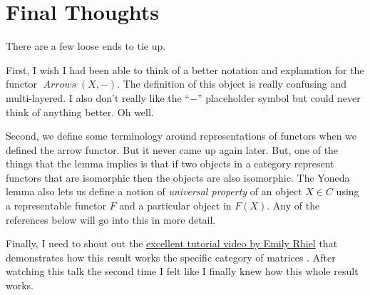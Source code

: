 \documentclass[12pt]{article}
\theoremstyle{definition}
\theoremstyle{definition}
\theoremstyle{definition}
\numberwithin{equation}{section}
\DeclareMathOperator{\Arrows}{\mathit{Arrows}}
\begin{document}
\section{Final Thoughts}

There are a few loose ends to tie up.

First, I wish I had been able to think of a better notation and explanation for the functor 
$\Arrows(X, -)$. The definition of this object is really confusing and multi-layered. 
I also don't really like the ``$-$'' placeholder symbol but could 
never think of anything better. Oh well.

Second, we define some terminology around representations of functors when we defined the arrow functor. But 
it never came up again later. But, one of the things that the lemma implies is that if two objects 
in a category represent functors that are isomorphic
then the objects are also isomorphic. The Yoneda lemma also lets us define a notion of {\it universal property} 
of an object $X \in C$ using a representable functor $F$ and a particular object in $F(X)$.
Any of the references below will go into this in more detail.

Finally, I need to shout out the 
\href{https://www.youtube.com/watch?v=SsgEvrDFJsM}{excellent tutorial video by Emily Rhiel} 
that demonstrates how this result works
the specific category of matrices \cite{Rhiel2020}. After watching this talk the second time
I felt like I finally knew how this whole result works.
\end{document}
